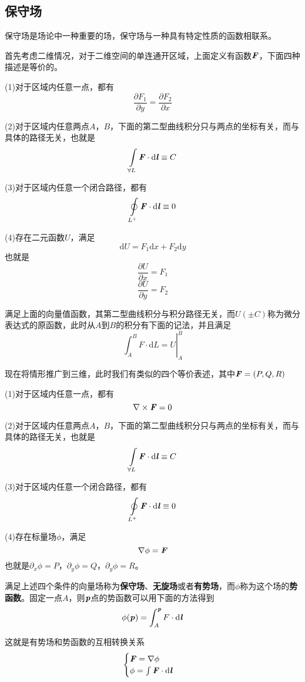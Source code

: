 \documentclass[UTF8,openany]{book}
\begin{document}
	\subsection{保守场}
	\par 保守场是场论中一种重要的场，保守场与一种具有特定性质的函数相联系。
	\par 首先考虑二维情况，对于二维空间的单连通开区域，上面定义有函数$\textbf{\textit{F}}$，下面四种描述是等价的。
	\par (1)对于区域内任意一点，都有
	$$\frac{\partial F_1}{\partial y}=\frac{\partial F_2}{\partial x}$$
	\par (2)对于区域内任意两点$A$，$B$，下面的第二型曲线积分只与两点的坐标有关，而与具体的路径无关，也就是
	$$\int\limits_{\forall L}\textbf{\textit{F}}\cdot\mathrm{d}\textbf{\textit{l}}\equiv C$$
	\par (3)对于区域内任意一个闭合路径，都有
	$$\oint\limits_{L^+}\textbf{\textit{F}}\cdot\mathrm{d}\textbf{\textit{l}}\equiv0$$
	\par (4)存在二元函数$U$，满足
	$$\mathrm{d}U=F_1\mathrm{d}x+F_2\mathrm{d}y$$
	也就是
	$$\frac{\partial U}{\partial x}=F_1$$
	$$\frac{\partial U}{\partial y}=F_2$$
	\par 满足上面的向量值函数，其第二型曲线积分与积分路径无关，而$U(\pm C)$称为微分表达式的原函数，此时从$A$到$B$的积分有下面的记法，并且满足
	$$\left.\int_{A}^{B}F\cdot\mathrm{d}L=U\right|_{A}^B$$
	\par 现在将情形推广到三维，此时我们有类似的四个等价表述，其中$\textbf{\textit{F}}=(P,Q,R)$
	\par (1)对于区域内任意一点，都有
	$$\nabla\times\textbf{\textit{F}}=0$$
	\par (2)对于区域内任意两点$A$，$B$，下面的第二型曲线积分只与两点的坐标有关，而与具体的路径无关，也就是
	$$\int\limits_{\forall L}\textbf{\textit{F}}\cdot\mathrm{d}\textbf{\textit{l}}\equiv C$$
	\par (3)对于区域内任意一个闭合路径，都有
	$$\oint\limits_{L^+}\textbf{\textit{F}}\cdot\mathrm{d}\textbf{\textit{l}}\equiv0$$
	\par (4)存在标量场$\phi$，满足
	$$\nabla\phi=\textbf{\textit{F}}$$
	也就是$\partial_x\phi=P$，$\partial_y\phi=Q$，$\partial_y\phi=R$。
	\par 满足上述四个条件的向量场称为\textbf{保守场}、\textbf{无旋场}或者\textbf{有势场}，而$\phi$称为这个场的\textbf{势函数}。固定一点$A$，则$\textbf{\textit{p}}$点的势函数可以用下面的方法得到
	$$\phi(\textbf{\textit{p}})=\int_{A}^{\textbf{\textit{p}}}F\cdot\mathrm{d}\textbf{\textit{l}}$$
	\par 这就是有势场和势函数的互相转换关系
	$$\begin{cases}
		\textbf{\textit{F}}=\nabla\phi\\
		\phi=\int\textbf{\textit{F}}\cdot\mathrm{d}\textbf{\textit{l}}\\
	\end{cases}$$
	
\end{document}

